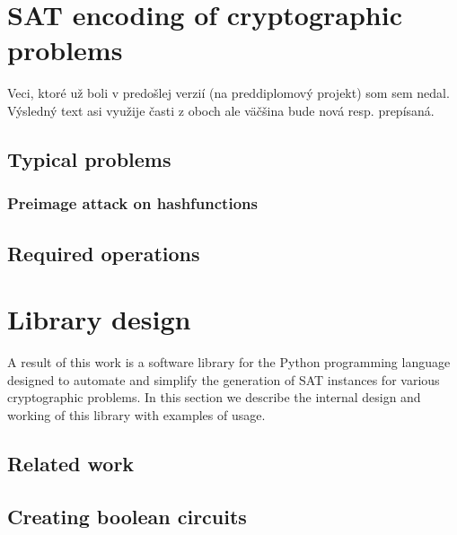 \chapter{SAT encoding of cryptographic problems}


\begin{framed}
\noindent Veci, ktoré už boli v predošlej verzií (na preddiplomový projekt) som sem nedal. Výsledný text asi využije časti z oboch ale väčšina bude nová resp. prepísaná.
\end{framed}


\section{Typical problems}
\subsection{Preimage attack on hashfunctions}

\section{Required operations}

\chapter{Library design}

A result of this work is a software library for the Python programming language designed to automate and simplify the generation of SAT instances for various cryptographic problems.
In this section we describe the internal design and working of this library with examples of usage.

\section{Related work}


\section{Creating boolean circuits}

